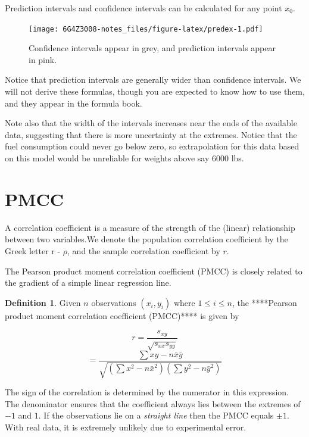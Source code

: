 \documentclass[
]{book}
\theoremstyle{definition}
\newtheorem{definition}{Definition}[chapter]
\theoremstyle{definition}
\theoremstyle{definition}
\theoremstyle{definition}
\theoremstyle{remark}
\begin{document}
Prediction intervals and confidence intervals can be calculated for any point \(x_0\).

\begin{figure}
\centering
\texttt{[image: 6G4Z3008-notes\_files/figure-latex/predex-1.pdf]}
\caption{\label{fig:predex}Confidence intervals appear in grey, and prediction intervals appear in pink.}
\end{figure}

Notice that prediction intervals are generally wider than confidence intervals. We will not derive these formulas, though you are expected to know how to use them, and they appear in the formula book.

Note also that the width of the intervals increases near the ends of the available data, suggesting that there is more uncertainty at the extremes. Notice that the fuel consumption could never go below zero, so extrapolation for this data based on this model would be unreliable for weights above say \(6000\) lbs.

\hypertarget{pmcc}{%
\section{PMCC}\label{pmcc}}

A correlation coefficient is a measure of the strength of the (linear) relationship between two variables.We denote the population correlation coefficient by the Greek letter r - \(\rho\), and the sample correlation coefficient by \(r\).

The Pearson product moment correlation coefficient (PMCC) is closely related to the gradient of a simple linear regression line.

\begin{definition}
Given \(n\) observations \((x_i,y_i)\) where \(1\leq i \leq n\), the ****Pearson product moment correlation coefficient (PMCC)**** is given by

\[r = \frac{s_{xy}}{\sqrt{s_{xx}s_{yy}}}\]
\[=\frac{\sum xy - n\bar{x}\bar{y}}{\sqrt{(\sum x^2 - n\bar{x}^2)(\sum y^2 - n\bar{y}^2)}} \]
\end{definition}

The sign of the correlation is determined by the numerator in this expression. The denominator ensures that the coefficient always lies between the extremes of \(-1\) and \(1\). If the observations lie on a \emph{straight line} then the PMCC equals \(\pm 1\). With real data, it is extremely unlikely due to experimental error.
\end{document}
